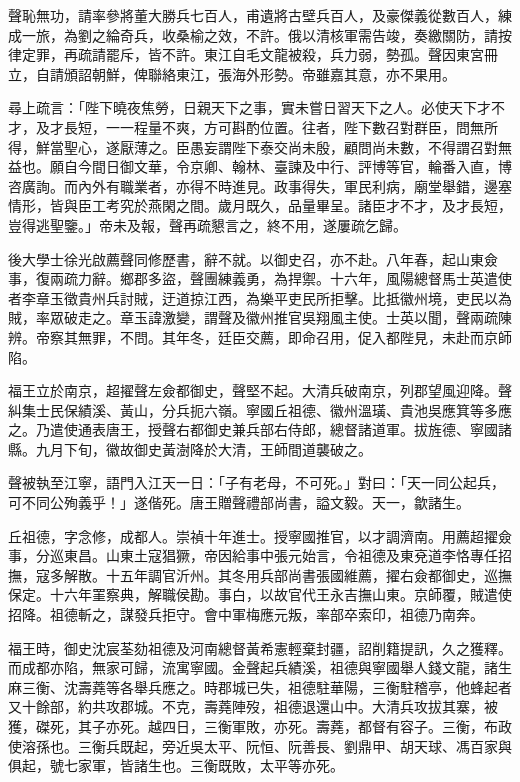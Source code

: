 \begin{pinyinscope}
{{聲恥無功，請率參將董大勝兵七百人，甫遺將古壁兵百人，及豪傑義從數百人，練成一旅，為劉之綸奇兵，收桑榆之效，不許。俄以清核軍需告竣，奏繳關防，請按律定罪，再疏請罷斥，皆不許。東江自毛文龍被殺，兵力弱，勢孤。聲因東宮冊立，自請頒詔朝鮮，俾聯絡東江，張海外形勢。帝雖嘉其意，亦不果用。

尋上疏言：「陛下曉夜焦勞，日親天下之事，實未嘗日習天下之人。必使天下才不才，及才長短，一一程量不爽，方可斟酌位置。往者，陛下數召對群臣，問無所得，鮮當聖心，遂厭薄之。臣愚妄謂陛下泰交尚未殷，顧問尚未數，不得謂召對無益也。願自今間日御文華，令京卿、翰林、臺諫及中行、評博等官，輪番入直，博咨廣詢。而內外有職業者，亦得不時進見。政事得失，軍民利病，廟堂舉錯，邊塞情形，皆與臣工考究於燕閑之間。歲月既久，品量畢呈。諸臣才不才，及才長短，豈得逃聖鑒。」帝未及報，聲再疏懇言之，終不用，遂屢疏乞歸。

後大學士徐光啟薦聲同修歷書，辭不就。以御史召，亦不赴。八年春，起山東僉事，復兩疏力辭。鄉郡多盜，聲團練義勇，為捍禦。十六年，風陽總督馬士英遣使者李章玉徵貴州兵討賊，迂道掠江西，為樂平吏民所拒擊。比抵徽州境，吏民以為賊，率眾破走之。章玉諱激變，謂聲及徽州推官吳翔風主使。士英以聞，聲兩疏陳辨。帝察其無罪，不問。其年冬，廷臣交薦，即命召用，促入都陛見，未赴而京師陷。

福王立於南京，超擢聲左僉都御史，聲堅不起。大清兵破南京，列郡望風迎降。聲糾集士民保績溪、黃山，分兵扼六嶺。寧國丘祖德、徽州溫璜、貴池吳應箕等多應之。乃遣使通表唐王，授聲右都御史兼兵部右侍郎，總督諸道軍。拔旌德、寧國諸縣。九月下旬，徽故御史黃澍降於大清，王師間道襲破之。

聲被執至江寧，語門入江天一日：「子有老母，不可死。」對曰：「天一同公起兵，可不同公殉義乎！」遂偕死。唐王贈聲禮部尚書，謚文毅。天一，歙諸生。

丘祖德，字念修，成都人。崇禎十年進士。授寧國推官，以才調濟南。用薦超擢僉事，分巡東昌。山東土寇猖獗，帝因給事中張元始言，令祖德及東兗道李恪專任招撫，寇多解散。十五年調官沂州。其冬用兵部尚書張國維薦，擢右僉都御史，巡撫保定。十六年罣察典，解職侯勘。事白，以故官代王永吉撫山東。京師覆，賊遣使招降。祖德斬之，謀發兵拒守。會中軍梅應元叛，率部卒索印，祖德乃南奔。

福王時，御史沈宸荃劾祖德及河南總督黃希憲輕棄封疆，詔削籍提訊，久之獲釋。而成都亦陷，無家可歸，流寓寧國。金聲起兵績溪，祖德與寧國舉人錢文龍，諸生麻三衡、沈壽蕘等各舉兵應之。時郡城已失，祖德駐華陽，三衡駐稽亭，他蜂起者又十餘部，約共攻郡城。不克，壽蕘陣歿，祖德退還山中。大清兵攻拔其寨，被獲，磔死，其子亦死。越四日，三衡軍敗，亦死。壽蕘，都督有容子。三衡，布政使溶孫也。三衡兵既起，旁近吳太平、阮恒、阮善長、劉鼎甲、胡天球、馮百家與俱起，號七家軍，皆諸生也。三衡既敗，太平等亦死。

}}
\end{pinyinscope}
